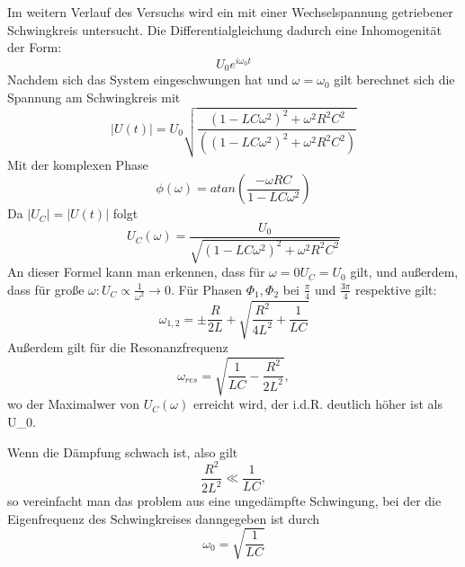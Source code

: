 \documentclass{scrartcl}
\begin{document}
          Im weitern Verlauf des Versuchs wird ein mit einer Wechselspannung getriebener Schwingkreis
          untersucht. Die Differentialgleichung dadurch eine Inhomogenität der Form:
          \begin{equation*}
              U_0e^{i\omega_0 t}
          \end{equation*}
          Nachdem sich das System eingeschwungen hat und $\omega =\omega_0$ gilt
          berechnet sich die Spannung am Schwingkreis mit
          \begin{equation}
              |U(t)| = U_0\sqrt{\frac{(1-LC\omega^2)^2+\omega^2R^2C^2}{((1-LC\omega^2)^2+\omega^2R^2C^2)}}
          \end{equation}
          Mit der komplexen Phase
          \begin{equation}
              \label{eqn:Phase}
              \phi(\omega) = atan\left(\frac{-\omega RC}{1-LC\omega^2}\right)
          \end{equation}
          Da $|U_C|=|U(t)|$ folgt
          \begin{equation}
              U_C(\omega)=\frac{U_0}{\sqrt{(1-LC\omega^2)^2+\omega^2R^2C^2}}
          \end{equation}
          An dieser Formel kann man erkennen, dass für $\omega = 0 U_C = U_0$ gilt,
          und außerdem, dass für große $\omega : U_C \propto \frac{1}{\omega^2} \rightarrow 0.$
          Für Phasen $\Phi_1,\Phi_2$ bei  $\frac{\pi}{4}$ und $\frac{3\pi}{4}$ respektive
          gilt:
          \begin{equation}
              \label{eqn:Spektrum}
              \omega_{1,2}=\pm \frac{R}{2L}+\sqrt{\frac{R^2}{4L^2}+\frac{1}{LC}}
          \end{equation}
          Außerdem gilt für die Resonanzfrequenz
          \begin{equation}
              \label{eqn:ResFrequenz}
              \omega_{res} = \sqrt{\frac{1}{LC}-\frac{R^2}{2L^2}},
          \end{equation}
          wo der Maximalwer von $U_C(\omega)$ erreicht wird, der i.d.R. deutlich höher ist als U_0.

           Wenn die Dämpfung schwach ist, also gilt
           \begin{equation*}
               \frac{R^2}{2L^2}\ll \frac{1}{LC},
           \end{equation*}
           so vereinfacht man das problem aus eine ungedämpfte Schwingung, bei der die Eigenfrequenz des Schwingkreises danngegeben ist durch
           \begin{equation}
               \omega_0 = \sqrt{\frac{1}{LC}}
           \end{equation}
\end{document}
